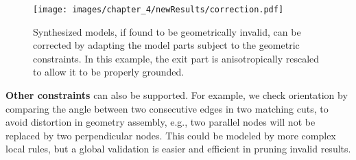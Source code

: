 \begin{figure}[h!]
	\centering
		\texttt{[image: images/chapter\_4/newResults/correction.pdf]}
		\caption[Functional correction of models.]{Synthesized models, if found to be geometrically invalid, can be corrected by adapting the model parts
		subject to the geometric constraints. In this example, the exit part is anisotropically rescaled to allow it to be properly grounded. }
\label{fig:geometric_constraints}
\end{figure}


\noindent \textbf{Other constraints} can also be supported. For example, we check orientation by comparing the angle between two consecutive edges in two matching cuts, to avoid distortion in geometry assembly, e.g., two parallel nodes will not be replaced by two perpendicular nodes. This could be modeled by more complex local rules, but a global validation is easier and efficient in pruning invalid results.


